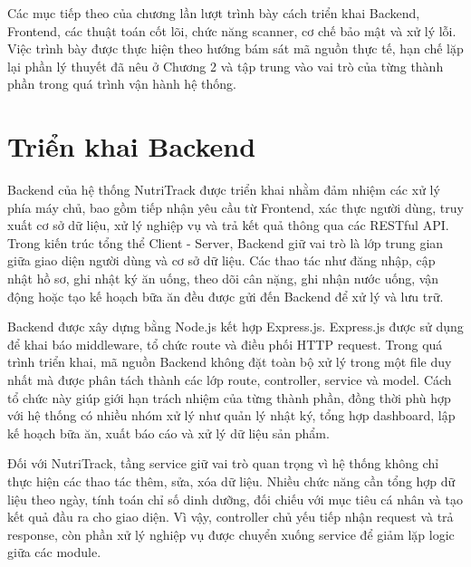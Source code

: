 \documentclass[12pt, a4paper]{report}
\begin{document}
Các mục tiếp theo của chương lần lượt trình bày cách triển khai Backend, Frontend, các thuật toán cốt lõi, chức năng scanner, cơ chế bảo mật và xử lý lỗi. Việc trình bày được thực hiện theo hướng bám sát mã nguồn thực tế, hạn chế lặp lại phần lý thuyết đã nêu ở Chương 2 và tập trung vào vai trò của từng thành phần trong quá trình vận hành hệ thống.

\section{Triển khai Backend}Backend của hệ thống NutriTrack được triển khai nhằm đảm nhiệm các xử lý phía máy chủ, bao gồm tiếp nhận yêu cầu từ Frontend, xác thực người dùng, truy xuất cơ sở dữ liệu, xử lý nghiệp vụ và trả kết quả thông qua các RESTful API. Trong kiến trúc tổng thể Client - Server, Backend giữ vai trò là lớp trung gian giữa giao diện người dùng và cơ sở dữ liệu. Các thao tác như đăng nhập, cập nhật hồ sơ, ghi nhật ký ăn uống, theo dõi cân nặng, ghi nhận nước uống, vận động hoặc tạo kế hoạch bữa ăn đều được gửi đến Backend để xử lý và lưu trữ.

Backend được xây dựng bằng Node.js kết hợp Express.js. Express.js được sử dụng để khai báo middleware, tổ chức route và điều phối HTTP request. Trong quá trình triển khai, mã nguồn Backend không đặt toàn bộ xử lý trong một file duy nhất mà được phân tách thành các lớp route, controller, service và model. Cách tổ chức này giúp giới hạn trách nhiệm của từng thành phần, đồng thời phù hợp với hệ thống có nhiều nhóm xử lý như quản lý nhật ký, tổng hợp dashboard, lập kế hoạch bữa ăn, xuất báo cáo và xử lý dữ liệu sản phẩm.

Đối với NutriTrack, tầng service giữ vai trò quan trọng vì hệ thống không chỉ thực hiện các thao tác thêm, sửa, xóa dữ liệu. Nhiều chức năng cần tổng hợp dữ liệu theo ngày, tính toán chỉ số dinh dưỡng, đối chiếu với mục tiêu cá nhân và tạo kết quả đầu ra cho giao diện. Vì vậy, controller chủ yếu tiếp nhận request và trả response, còn phần xử lý nghiệp vụ được chuyển xuống service để giảm lặp logic giữa các module.
\end{document}

